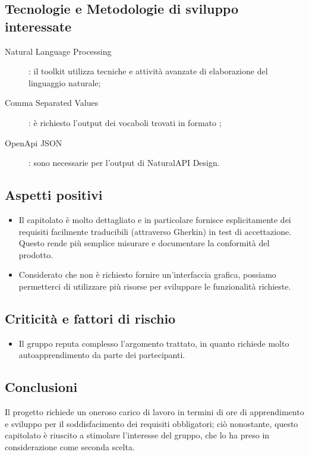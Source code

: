 \documentclass[../studio-di-fattibilita.tex]{subfiles}
\begin{document}
  \subsection{Tecnologie e Metodologie di sviluppo interessate}%
  \label{subsec:tecnologie_interessate}
  \begin{description}
    \item[Natural Language Processing]: il toolkit utilizza tecniche e attività avanzate di elaborazione del linguaggio naturale;
    \item[Comma Separated Values]: è richiesto l'output dei vocaboli trovati in formato ;
    \item[OpenApi JSON]: sono necessarie per l'output di NaturalAPI Design.
  \end{description}


  \subsection{Aspetti positivi}%
  \label{subsec:aspetti_positivi}
  \begin{itemize}
    \item Il capitolato è molto dettagliato e in particolare fornisce esplicitamente dei requisiti facilmente traducibili (attraverso Gherkin) in test di accettazione. Questo rende più semplice misurare e documentare la conformità del prodotto.
    \item Considerato che non è richiesto fornire un'interfaccia grafica, possiamo permetterci di utilizzare più risorse per sviluppare le funzionalità richieste.
  \end{itemize}


  \subsection{Criticità e fattori di rischio}%
  \label{subsec:criticita_e_fattori_di_rischio}
  \begin{itemize}
    \item Il gruppo reputa complesso l'argomento trattato, in quanto richiede molto autoapprendimento da parte dei partecipanti.
  \end{itemize}


  \subsection{Conclusioni}%
  \label{subsec:conclusioni}
  Il progetto richiede un oneroso carico di lavoro in termini di ore di apprendimento e sviluppo per il soddisfacimento dei requisiti obbligatori; ciò nonostante, questo capitolato è riuscito a stimolare l'interesse del gruppo, che lo ha preso in considerazione come seconda scelta.
\end{document}
